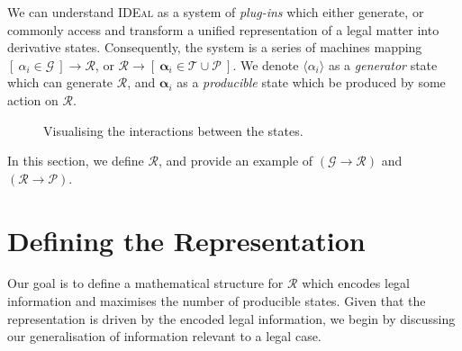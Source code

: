 \documentclass{article}
\newcounter{pic}[page]
\newcounter{fig}[page]
\numberwithin{equation}{section}
\newcommand{\ideal}{\textsc{IDEal }}
\newcommand{\braket}[1]{\langle #1 \rangle}
\begin{document}
We can understand \ideal as a system of \textit{plug-ins} which either generate, or commonly access and transform a unified representation of a legal matter into derivative states. Consequently, the system is a series of machines mapping $[ \ \alpha_i \in \mathcal{G} \ ] \rightarrow \mathcal{R}$, or $\mathcal{R} \rightarrow [ \ \mathbf{\alpha}_i \in \mathcal{T \cup P} \ ]$. We denote $\braket{\alpha_i}$ as a \textit{generator} state which can generate $\mathcal{R}$, and $\mathbf{\alpha}_i$ as a \textit{producible} state which be produced by some action on $\mathcal{R}$.
\begin{figure}[h]
\begin{center}
\end{center}
\caption{Visualising the interactions between the states.}
\end{figure}

In this section, we define $\mathcal{R}$, and provide an example of $(\mathcal{G} \rightarrow \mathcal{R})$ and $(\mathcal{R} \rightarrow \mathcal{P})$.



\section{Defining the Representation}

Our goal is to define a mathematical structure for $\mathcal{R}$ which encodes legal information and maximises the number of producible states. Given that the representation is driven by the encoded legal information, we begin by discussing our generalisation of information relevant to a legal case.
\end{document}
